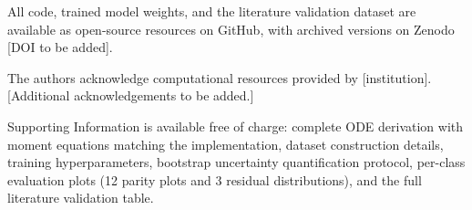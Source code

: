 \documentclass[journal=mamobx,manuscript=article]{achemso}
\begin{document}
All code, trained model weights, and the literature validation dataset are available as open-source resources on GitHub, with archived versions on Zenodo [DOI to be added].

\begin{acknowledgement}
The authors acknowledge computational resources provided by [institution]. [Additional acknowledgements to be added.]
\end{acknowledgement}

\begin{suppinfo}
Supporting Information is available free of charge: complete ODE derivation with moment equations matching the implementation, dataset construction details, training hyperparameters, bootstrap uncertainty quantification protocol, per-class evaluation plots (12 parity plots and 3 residual distributions), and the full literature validation table.
\end{suppinfo}


\end{document}
